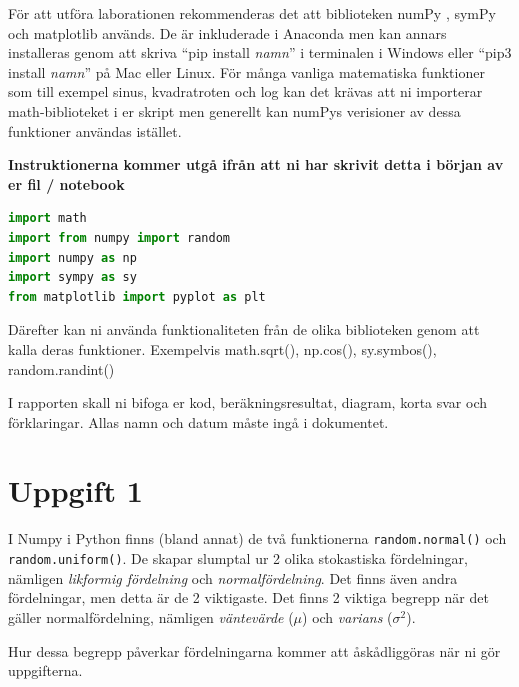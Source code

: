 \documentclass[a4paper]{article}
\begin{document}
För att utföra laborationen rekommenderas det att biblioteken numPy \cite{numpy-main},
symPy \cite{sympy-main} och matplotlib \cite{matplotlib-main} används. De är inkluderade i Anaconda men kan annars installeras genom att
skriva ``pip install \textit{namn}'' i terminalen i Windows eller ``pip3 install \textit{namn}'' på Mac eller Linux. 
För många vanliga matematiska funktioner som till
exempel sinus, kvadratroten och log kan det krävas att ni importerar math-biblioteket i er skript men generellt kan numPys
verisioner av dessa funktioner användas istället.

\textbf{Instruktionerna kommer utgå ifrån att ni har skrivit detta i början av er fil / notebook}
\begin{lstlisting}[language=Python] 
import math
import from numpy import random
import numpy as np
import sympy as sy
from matplotlib import pyplot as plt
\end{lstlisting}

Därefter kan ni använda funktionaliteten från de olika biblioteken genom att
kalla deras funktioner. Exempelvis math.sqrt(), np.cos(), sy.symbos(), random.randint()

I rapporten skall ni bifoga er kod, beräkningsresultat, diagram, korta svar och förklaringar.
Allas namn och datum måste ingå i dokumentet.


\newpage
\section{Uppgift 1}
I Numpy i Python finns (bland annat) de två funktionerna \lstinline{random.normal()} och \lstinline{random.uniform()}.
De skapar slumptal ur 2 olika stokastiska fördelningar, nämligen \textit{likformig fördelning} och \textit{normalfördelning}.
Det finns även andra fördelningar, men detta är de 2 viktigaste. Det finns 2 viktiga begrepp när det gäller
normalfördelning, nämligen \textit{väntevärde} (\(\mu\)) och \textit{varians} (\(\sigma^2\)).

Hur dessa begrepp påverkar fördelningarna kommer att åskådliggöras när ni gör uppgifterna.

\end{document}

